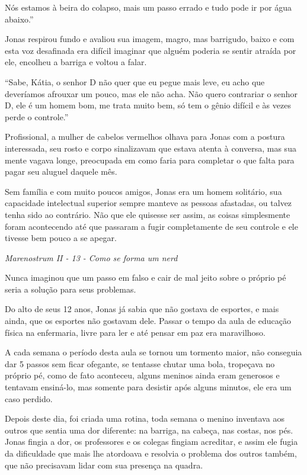 Nós estamos à beira do colapso, mais um passo errado e tudo pode ir por
água abaixo.''

Jonas respirou fundo e avaliou sua imagem, magro, mas barrigudo, baixo e
com esta voz desafinada era difícil imaginar que alguém poderia se
sentir atraída por ele, encolheu a barriga e voltou a falar.

``Sabe, Kátia, o senhor D não quer que eu pegue mais leve, eu acho que
deveríamos afrouxar um pouco, mas ele não acha. Não quero contrariar o
senhor D, ele é um homem bom, me trata muito bem, só tem o gênio difícil
e às vezes perde o controle.''

Profissional, a mulher de cabelos vermelhos olhava para Jonas com a
postura interessada, seu rosto e corpo sinalizavam que estava atenta à
conversa, mas sua mente vagava longe, preocupada em como faria para
completar o que falta para pagar seu aluguel daquele mês.

Sem família e com muito poucos amigos, Jonas era um homem solitário, sua
capacidade intelectual superior sempre manteve as pessoas afastadas, ou
talvez tenha sido ao contrário. Não que ele quisesse ser assim, as
coisas simplesmente foram acontecendo até que passaram a fugir
completamente de seu controle e ele tivesse bem pouco a se apegar.

\asterisc

\emph{Marenostrum II - 13 - Como se forma um nerd}

Nunca imaginou que um passo em falso e cair de mal jeito sobre o próprio
pé seria a solução para seus problemas.

Do alto de seus 12 anos, Jonas já sabia que não gostava de esportes, e
mais ainda, que os esportes não gostavam dele. Passar o tempo da aula de
educação física na enfermaria, livre para ler e até pensar em paz era
maravilhoso.

A cada semana o período desta aula se tornou um tormento maior, não
conseguia dar 5 passos sem ficar ofegante, se tentasse chutar uma bola,
tropeçava no próprio pé, como de fato aconteceu, alguns meninos ainda
eram generosos e tentavam ensiná-lo, mas somente para desistir após
alguns minutos, ele era um caso perdido.

Depois deste dia, foi criada uma rotina, toda semana o menino inventava
aos outros que sentia uma dor diferente: na barriga, na cabeça, nas
costas, nos pés. Jonas fingia a dor, os professores e os colegas fingiam
acreditar, e assim ele fugia da dificuldade que mais lhe atordoava e
resolvia o problema dos outros também, que não precisavam lidar com sua
presença na quadra.

